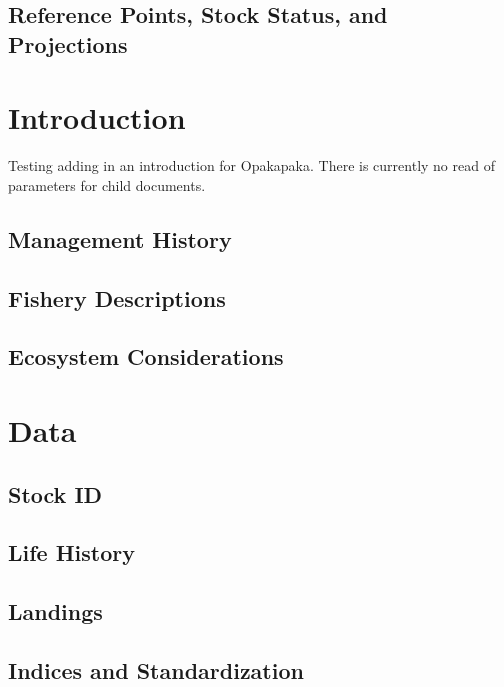 \documentclass[
]{scrartcl}
\begin{document}
\subsection{Reference Points, Stock Status, and
Projections}\label{reference-points-stock-status-and-projections}

\newpage{}

\section{Introduction}\label{sec-intro}

Testing adding in an introduction for Opakapaka. There is currently no
read of parameters for child documents.

\subsection{Management History}\label{management-history}

\subsection{Fishery Descriptions}\label{fishery-descriptions}

\subsection{Ecosystem Considerations}\label{ecosystem-considerations}

\newpage{}

\section{Data}\label{sec-data}

\subsection{Stock ID}\label{stock-id}

\subsection{Life History}\label{life-history}

\subsection{Landings}\label{landings}

\subsection{Indices and
Standardization}\label{indices-and-standardization}
\end{document}
